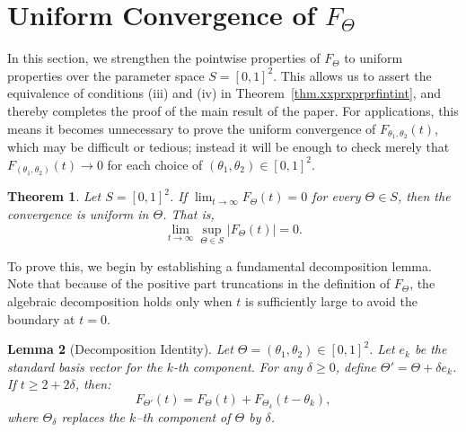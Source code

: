 \documentclass[10pt,reqno]{amsart}
\newtheorem{theorem}{Theorem}
\newtheorem{lemma}[theorem]{Lemma}
\theoremstyle{definition}
\begin{document}
	
	\section{Uniform Convergence of $F_\Theta$}
	In this section, we strengthen the pointwise properties of $F_\Theta$ to uniform properties over the parameter space $S = [0,1]^2$. This allows us to assert the equivalence of conditions (iii) and (iv) in Theorem~\ref{thm.xxprxprprfintint}, and thereby completes the proof of the main result of the paper. For applications, this means it becomes unnecessary to prove the uniform convergence of $F_{\theta_1,\theta_2}(t)$, which may be difficult or tedious; instead it will be enough to check merely that $F_{(\theta_1,\theta_2)}(t)\to 0$ for each choice of $(\theta_1,\theta_2)\in [0,1]^2$. 
	\begin{theorem} \label{thm:uniformity}
		Let $S = [0,1]^2$. If $\lim_{t \to \infty} F_\Theta(t) = 0$ for every $\Theta \in S$, then the convergence is uniform in $\Theta$. That is,
		\[ \lim_{t \to \infty} \sup_{\Theta \in S} |F_\Theta(t)| = 0. \]
\end{theorem}
To prove this, we begin by establishing a fundamental decomposition lemma. Note that because of the positive part truncations in the definition of $F_\Theta$, the algebraic decomposition holds only when $t$ is sufficiently large to avoid the boundary at $t=0$.
\begin{lemma}[Decomposition Identity]
	Let $\Theta = (\theta_1,\theta_2) \in [0,1]^2$. Let $e_k$ be the standard basis vector for the $k$-th component. For any $\delta \ge 0$, define $\Theta' = \Theta + \delta e_k$.
	If $t \ge 2 + 2\delta$, then:
	\begin{equation} \label{eq:decomp}
		F_{\Theta'}(t) = F_{\Theta}(t) + F_{\Theta_{\delta}}(t - \theta_k),
	\end{equation}
	where $\Theta_{\delta}$ replaces the $k$--th component of $\Theta$ by $\delta$. 
\end{lemma}
\end{document}
